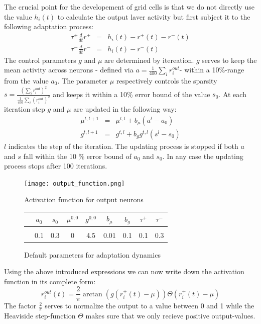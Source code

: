 \documentclass[a4paper, 12pt]{article}
\begin{document}
\noindent The crucial point for the developement of grid cells is that we do not directly use the value $h_i(t)$ to calculate the output laver activity but first subject it to the following adaptation process: 
	\begin{eqnarray}
	\tau^+\frac{d}{dt}r^+ &=& h_i(t)-r^+(t)-r^-(t)\\
	\tau^-\frac{d}{dt}r^- &=& h_i(t)-r^-(t)
	\end{eqnarray}
The control parameters $g$ and $\mu$ are determined by itereation. $g$ serves to keep the mean activity across neurons - defined via $a= \frac{1}{400}\sum_ir_i^{out}$- within a 10\%-range from the value $a_0$. The parameter $\mu$ respectively controls the sparsity $s=\frac{(\sum_ir_i^{out})^2}{\frac{1}{400}\sum_i (r_i^{out})^2}$ and keeps it within a 10\% error bound of the value $s_0$. At each iteration step $g$ and $\mu$ are updated in the following way: 
	\begin{eqnarray}
	\mu^{t, l+1} &=& \mu^{t,l}+b_\mu(a^{l}-a_0)\\
	g^{t,l+1} &=& g^{t,l}+ b_gg^{t,l}(s^l-s_0)
	\end{eqnarray}
\noindent $l$ indicates the step of the iteration. The updating process is stopped if both $a$ and $s$ fall within the 10 \% error bound of $a_0$ and $s_0$. In any case the updating process stops after 100 iterations. 
	
\begin{figure}[h]
\setlength{\abovecaptionskip}{5pt}
\setlength{\belowcaptionskip}{0pt}	
	\begin{minipage}[t]{0.5\textwidth}\vspace{0pt}
	\texttt{[image: output\_function.png]}
	\caption{\footnotesize{Activation function for output neurons}}
	\end{minipage}
\hfill
	\begin{minipage}[t]{0.5\textwidth}\vspace{20pt}
	\begin{tabular}{c|cccccccc}
	& $a_0$ & $s_0$ & $\mu^{0,0}$ & $g^{0,0}$ & $b_\mu$ & $b_g$& $\tau^+$ & $\tau^-$\\
	\hline\\
	& 0.1 & 0.3 & 0 & 4.5 & 0.01 & 0.1& 0.1 & 0.3\\
	\end{tabular}
	\caption{\footnotesize{Default parameters for adaptation dynamics}}
	\end{minipage}
\end{figure}	

\noindent Using the above introduced expressions we can now write down the activation function in its complete form: 
	\begin{equation}
	r_i^{out}(t)=\frac{2}{\pi}\arctan(g(r_i^+(t)-\mu))\Theta( r_i^+(t)-\mu)
	\end{equation}
The factor $\frac{2}{\pi}$ serves to normalize the output to a value between 0 and 1 while the Heaviside step-function $\Theta$ makes sure that we only recieve positive output-values. 
%
%
%
\end{document}
